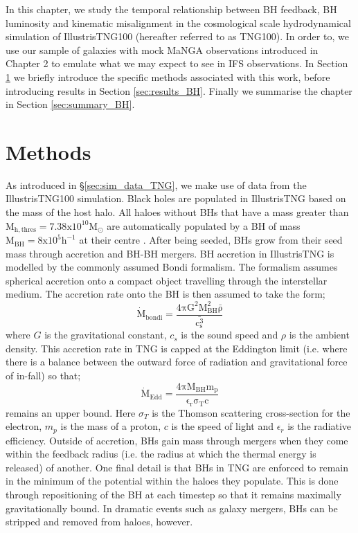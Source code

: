 In this chapter, we study the temporal relationship between BH feedback, BH luminosity and kinematic misalignment in the cosmological scale hydrodynamical simulation of IllustrisTNG100 (hereafter referred to as TNG100). In order to, we use our sample of galaxies with mock MaNGA observations introduced in Chapter 2 to emulate what we may expect to see in IFS observations. In Section \ref{sec:methods_BH} we briefly introduce the specific methods associated with this work, before introducing results in Section \ref{sec:results_BH}. Finally we summarise the chapter in Section \ref{sec:summary_BH}.

\section{Methods} \label{sec:methods_BH}
As introduced in \S\ref{sec:sim_data_TNG}, we make use of data from the IllustrisTNG100 simulation. Black holes are populated in IllustrisTNG based on the mass of the host halo. All haloes without BHs that have a mass greater than $\mathrm{M_{h,thres} = 7.38 x 10^{10} M_{\odot} }$ are automatically populated by a BH of mass $\mathrm{M_{BH} = 8 x 10^{5} h^{-1}}$ at their centre \citep[termed halo-based BH formation, see also;][]{sijacki2009, dimatteo2012, hirschmann2014, sijacki2015}. After being seeded, BHs grow from their seed mass through accretion and BH-BH mergers. BH accretion in IllustrisTNG is modelled by the commonly assumed Bondi formalism. The formalism assumes spherical accretion onto a compact object travelling through the interstellar medium. The accretion rate onto the BH is then assumed to take the form;
\begin{equation}
\mathrm{\dot{M}_{bondi} = \frac{4\pi G^{2} M_{BH}^{2} \bar{\rho}}{\bar{c^{3}_{s}}}}
\end{equation}
where $G$ is the gravitational constant, $c_{s}$ is the sound speed and $\rho$ is the ambient density. This accretion rate in TNG is capped at the Eddington limit (i.e. where there is a balance between the outward force of radiation and gravitational force of in-fall) so that;
\begin{equation}
\mathrm{\dot{M}_{Edd} = \frac{4\pi M_{BH} m_p}{\epsilon_r \sigma_T c} }
\end{equation}
remains an upper bound. Here $\sigma_T$ is the Thomson scattering cross-section for the electron, $m_p$ is the mass of a proton, $c$ is the speed of light and $\epsilon_r$ is the radiative efficiency. Outside of accretion, BHs gain mass through mergers when they come within the feedback radius (i.e. the radius at which the thermal energy is released) of another. One final detail is that BHs in TNG are enforced to remain in the minimum of the potential within the haloes they populate. This is done through repositioning of the BH at each timestep so that it remains maximally gravitationally bound. In dramatic events such as galaxy mergers, BHs can be stripped and removed from haloes, however. 

